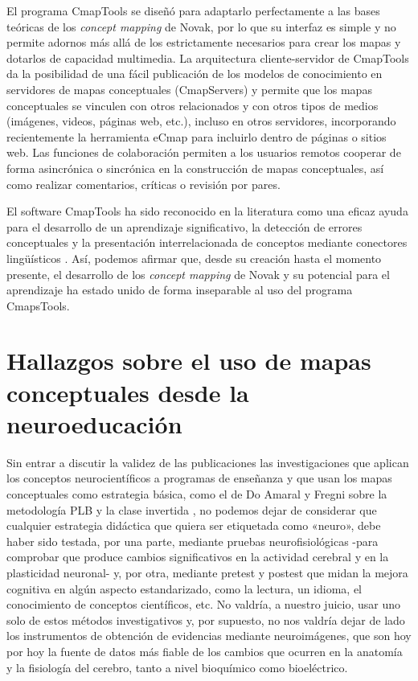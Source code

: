 \documentclass[spanish]{textolivre}
\begin{document}
El programa CmapTools se diseñó para adaptarlo perfectamente a las bases teóricas de los \textit{concept mapping} de Novak, por lo que su interfaz es simple y no permite adornos más allá de los estrictamente necesarios para crear los mapas y dotarlos de capacidad multimedia. La arquitectura cliente-servidor de CmapTools da la posibilidad de una fácil publicación de los modelos de conocimiento en servidores de mapas conceptuales (CmapServers) y permite que los mapas conceptuales se vinculen con otros relacionados y con otros tipos de medios (imágenes, videos, páginas web, etc.), incluso en otros servidores, incorporando recientemente la herramienta eCmap para incluirlo dentro de páginas o sitios web. Las funciones de colaboración permiten a los usuarios remotos cooperar de forma asincrónica o sincrónica en la construcción de mapas conceptuales, así como realizar comentarios, críticas o revisión por pares.

El software CmapTools ha sido reconocido en la literatura como una eficaz ayuda para el desarrollo de un aprendizaje significativo, la detección de errores conceptuales y la presentación interrelacionada de conceptos mediante conectores lingüísticos \cite{bezerra_cmap_2019,pedrajas2018innovacion,ramos2020aproximacion,suinaga2019cmap}. %
Así, podemos afirmar que, desde su creación hasta el momento presente, el desarrollo de los \textit{concept mapping} de Novak y su potencial para el aprendizaje ha estado unido de forma inseparable al uso del programa CmapsTools.



\section{Hallazgos sobre el uso de mapas conceptuales desde la neuroeducación}\label{sec-hallazgos}

Sin entrar a discutir la validez de las publicaciones las investigaciones que aplican los conceptos neurocientíficos a programas de enseñanza y que usan los mapas conceptuales como estrategia básica, como el de Do Amaral y Fregni sobre la metodología PLB y la clase invertida \cite{doamaral2021applying}, %
no podemos dejar de considerar que cualquier estrategia didáctica que quiera ser etiquetada como «neuro», debe haber sido testada, por una parte, mediante pruebas neurofisiológicas -para comprobar que produce cambios significativos en la actividad cerebral y en la plasticidad neuronal- y, por otra, mediante pretest y postest que midan la mejora cognitiva en algún aspecto estandarizado, como la lectura, un idioma, el conocimiento de conceptos científicos, etc. No valdría, a nuestro juicio, usar uno solo de estos métodos investigativos y, por supuesto, no nos valdría dejar de lado los instrumentos de obtención de evidencias mediante neuroimágenes, que son hoy por hoy la fuente de datos más fiable de los cambios que ocurren en la anatomía y la fisiología del cerebro, tanto a nivel bioquímico como bioeléctrico.
\end{document}
